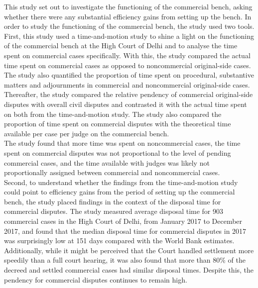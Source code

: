 \documentclass[a4paper, 12pt, twoside]{article}
\begin{document}
This study set out to investigate the functioning of the commercial bench, asking whether there were any substantial efficiency gains from setting up the bench. In order to study the functioning of the commercial bench, the study used two tools.\\

First, this study used a time-and-motion study to shine a light on the functioning of the commercial bench at the High Court of Delhi and to analyse the time spent on commercial cases specifically. With this, the study compared the actual time spent on commercial cases as opposed to noncommercial original-side cases. The study also quantified the proportion of time spent on procedural, substantive matters and adjournments in commercial and noncommercial original-side cases.\\

Thereafter, the study compared the relative pendency of commercial original-side disputes with overall civil disputes and contrasted it with the actual time spent on both from the time-and-motion study. The study also compared the proportion of time spent on commercial disputes with the theoretical time available per case per judge on the commercial bench. \\

The study found that more time was spent on noncommercial cases, the time spent on commercial disputes was not proportional to the level of pending commercial cases, and the time available with judges was likely not proportionally assigned between commercial and noncommercial cases. \\

Second, to understand whether the findings from the time-and-motion study could point to efficiency gains from the period of setting up the commercial bench, the study placed findings in the context of the disposal time for commercial disputes. The study measured average disposal time for 903 commercial cases in the High Court of Delhi, from January 2017 to December 2017, and found that the median disposal time for commercial disputes in 2017 was surprisingly low at 151 days compared with the World Bank estimates. Additionally, while it might be perceived that the Court handled settlement more speedily than a full court hearing, it was also found that more than 80\% of the decreed and settled commercial cases had similar disposal times. Despite this, the pendency for commercial disputes continues to remain high. \\
\end{document}
